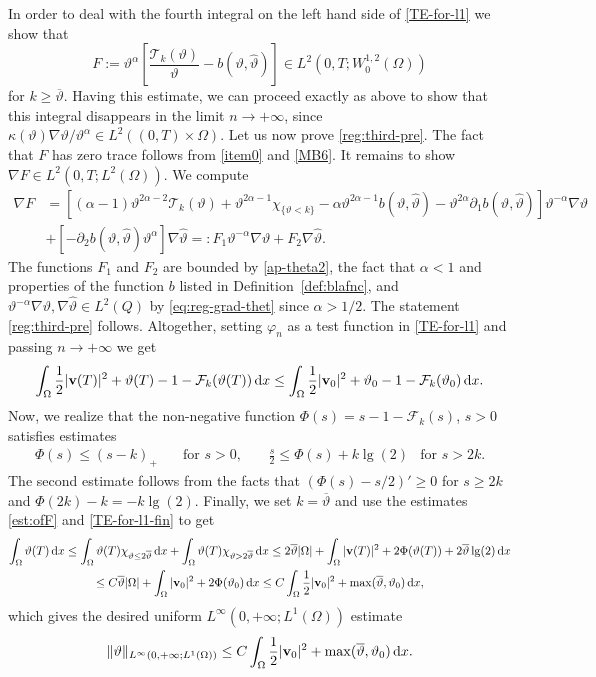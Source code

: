 \documentclass[11pt, a4paper, reqno]{amsart}
\numberwithin{equation}{section}
\newcommand{\thetah}{\hat\thet}
\newcommand{\vc}[1]{{\bf #1}}
\newcommand{\vv}{\vc{v}}
\newcommand{\thet}{\vartheta}
\newcommand{\dx}{\,{\rm d} {x}}
\newcommand{\intO}[1]{\int_{\Omega} #1 \dx}
\newcommand{\nm}[1]{\|#1\|}
\newcommand{\tmax}{\overline{\thet}}
\newcommand{\bb}{b}
\newcommand{\cF}{\mathcal{F}}
\newcommand{\cT}{\mathcal{T}}
\begin{document}
In order to deal with the fourth integral on the left hand side of \eqref{TE-for-l1} we show that
\begin{equation}\label{reg:third-pre}
F:=\thet^\alpha\left[\frac{\mathcal{T}_k(\thet)}\thet -\bb(\thet, \thetah)\right]\in L^{2}(0,T;W^{1,2}_0(\Omega))
\end{equation}
for $k\geq\tmax$. Having this estimate, we can proceed exactly as above to show that this integral disappears in the limit $n\to+\infty$, since $\kappa(\thet)\nabla \thet/\thet^\alpha\in L^2((0,T)\times\Omega)$. Let us now prove \eqref{reg:third-pre}. The fact that $F$ has zero trace follows from \eqref{item0} and \eqref{MB6}. It remains to show $\nabla F\in L^2(0,T;L^2(\Omega))$. We compute
\begin{align*}
  \nabla F&=\left[(\alpha-1)\thet^{2\alpha-2}\cT_k(\thet)+\thet^{2\alpha-1}\chi_{\{\thet<k\}}-\alpha\thet^{2\alpha-1}\bb(\thet,\thetah)-\thet^{2\alpha}\partial_1b(\thet,\thetah)\right]\thet^{-\alpha}\nabla\thet\\
  &+\left[-\partial_2\bb(\thet,\thetah)\thet^\alpha\right]\nabla\thetah =:F_1\thet^{-\alpha}\nabla\thet+F_2\nabla\thetah.
\end{align*}
The functions $F_1$ and $F_2$ are bounded by \eqref{ap-theta2}, the fact that $\alpha<1$ and properties of the function $b$ listed in Definition~\ref{def:blafnc}, and $\thet^{-\alpha}\nabla\thet,\nabla\thetah\in L^2(Q)$ by \eqref{eq:reg-grad-thet} since $\alpha>1/2$. The statement \eqref{reg:third-pre} follows.
Altogether, setting $\varphi_n$ as a test function in \eqref{TE-for-l1} and passing $n\to+\infty$ we get
\begin{equation}\label{TE-for-l1-fin}
  \intO{\frac12{|\vv(T)|^2} + \thet(T)-1 -\cF_k(\thet(T))}
  \leq \intO{\frac12{|\vv_0|^2} + \thet_0-1 -\cF_k(\thet_0)}.
\end{equation}
Now, we realize that the non-negative function $\Phi(s)=s-1-\cF_k(s)$, $s>0$ satisfies estimates
\begin{equation}\label{est:ofF}
\begin{aligned}
  \Phi(s)\leq (s-k)_+\quad &\mbox{for $s>0$,}\qquad
  \frac s2\leq \Phi(s)+k\lg(2)&\mbox{for $s>2k$.}
\end{aligned}
\end{equation}
The second estimate follows from the facts that $(\Phi(s)-s/2)'\geq 0$ for $s\geq 2k$ and $\Phi(2k)-k=-k\lg(2)$.
Finally, we set $k=\tmax$ and use the estimates \eqref{est:ofF} and \eqref{TE-for-l1-fin} to get
\begin{multline*}
  \intO{\thet(T)}\leq \intO{\thet(T)\chi_{\thet\leq 2\tmax}}+\intO{\thet(T)\chi_{\thet>2\tmax}}
  \leq 2\tmax|\Omega|+\intO{{|\vv(T)|^2} + 2\Phi(\thet(T))+2\tmax\lg(2)}\\
  \leq C\tmax|\Omega|+\intO{{|\vv_0|^2} + 2\Phi(\thet_0)}
  \leq C\intO{\frac12|\vv_0|^2+\max(\tmax,\thet_0)},
\end{multline*}
which gives the desired uniform $L^\infty(0,+\infty;L^1(\Omega))$ estimate
\begin{equation}\label{est:lnl1}
\nm{\thet}_{L^\infty(0,+\infty;L^1(\Omega))}\leq C\intO{\frac12|\vv_0|^2+\max(\tmax,\thet_0)}.
\end{equation}
\end{document}
